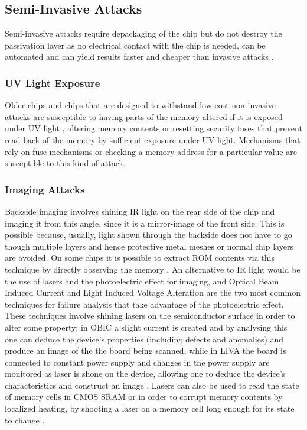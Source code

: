 	\subsection{Semi-Invasive Attacks}
	Semi-invasive attacks require depackaging of the chip but do not destroy the passivation layer as no electrical contact with the chip is needed, can be automated and can yield results faster and cheaper than invasive attacks \citep{sergei:thesis}.
	
	\subsubsection{UV Light Exposure}
	Older chips and chips that are designed to withstand low-cost non-invasive attacks are susceptible to having parts of the memory altered if it is exposed under UV light \citep{sergei:thesis}, altering memory contents or resetting security fuses that prevent read-back of the memory by sufficient exposure under UV light. Mechanisms that rely on fuse mechanisms or checking a memory address for a particular value are susceptible to this kind of attack.

	\subsubsection{Imaging Attacks}
	Backside imaging involves shining IR light on the rear side of the chip and imaging it from this angle, since it is a mirror-image of the front side. This is possible because, usually, light shown through the backside does not have to go though multiple layers and hence protective metal meshes or normal chip layers are avoided. On some chips it is possible to extract ROM contents via this technique by directly observing the memory \citep{sergei:thesis}. An alternative to IR light would be the use of lasers and the photoelectric effect for imaging, and Optical Beam Induced Current and Light Induced Voltage Alteration are the two most common techniques for failure analysis that take advantage of the photoelectric effect. These techniques involve shining lasers on the semiconductor surface in order to alter some property; in OBIC a slight current is created and by analysing this one can deduce the device's properties (including defects and anomalies) and produce an image of the the board being scanned, while in LIVA the board is connected to constant power supply and changes in the power supply are monitored as laser is shone on the device, allowing one to deduce the device's characteristics and construct an image \citep{cole:OBIC}. Lasers can also be used to read the state of memory cells in CMOS SRAM \citep{sergei:thesis} or in order to corrupt memory contents by localized heating, by shooting a laser on a memory cell long enough for its state to change \citep{website:riscure} \citep{sergei:thesis}.
	
